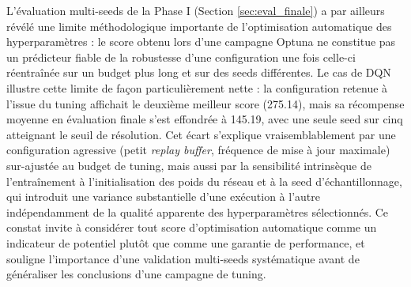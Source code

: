 L'évaluation multi-seeds de la Phase I (Section \ref{sec:eval_finale}) a par ailleurs révélé une limite méthodologique importante de l'optimisation automatique des hyperparamètres : le score obtenu lors d'une campagne Optuna \parencite{akibaOptunaNextgenerationHyperparameter2019} ne constitue pas un prédicteur fiable de la robustesse d'une configuration une fois celle-ci réentraînée sur un budget plus long et sur des seeds différentes. Le cas de DQN illustre cette limite de façon particulièrement nette : la configuration retenue à l'issue du tuning affichait le deuxième meilleur score (275.14), mais sa récompense moyenne en évaluation finale s'est effondrée à 145.19, avec une seule seed sur cinq atteignant le seuil de résolution. Cet écart s'explique vraisemblablement par une configuration agressive (petit \textit{replay buffer}, fréquence de mise à jour maximale) sur-ajustée au budget de tuning, mais aussi par la sensibilité intrinsèque de l'entraînement à l'initialisation des poids du réseau et à la seed d'échantillonnage, qui introduit une variance substantielle d'une exécution à l'autre indépendamment de la qualité apparente des hyperparamètres sélectionnés. Ce constat invite à considérer tout score d'optimisation automatique comme un indicateur de potentiel plutôt que comme une garantie de performance, et souligne l'importance d'une validation multi-seeds systématique avant de généraliser les conclusions d'une campagne de tuning.

